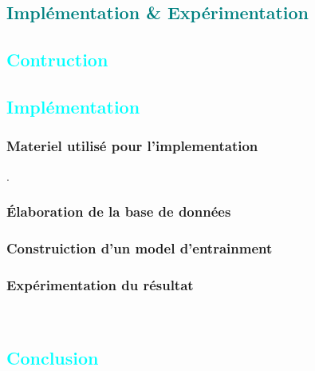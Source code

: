\textcolor{teal}{\part{Implémentation \& Expérimentation }}

\textcolor{cyan}{\chapter{Contruction }}

\textcolor{cyan}{\chapter{Implémentation }}

\section{Materiel utilisé pour l'implementation}
	\lipsum[1].
\section{Élaboration de la base de données}
	\lipsum[1]

\section{Construiction d'un model d'entrainment}
	\lipsum[1]
\section{Expérimentation du résultat}
	\lipsum[1] 
	\\
	\lipsum[1]


\textcolor{cyan}{\chapter{Conclusion}}
	\lipsum[2]
	\\ \\
	\lipsum[3]








